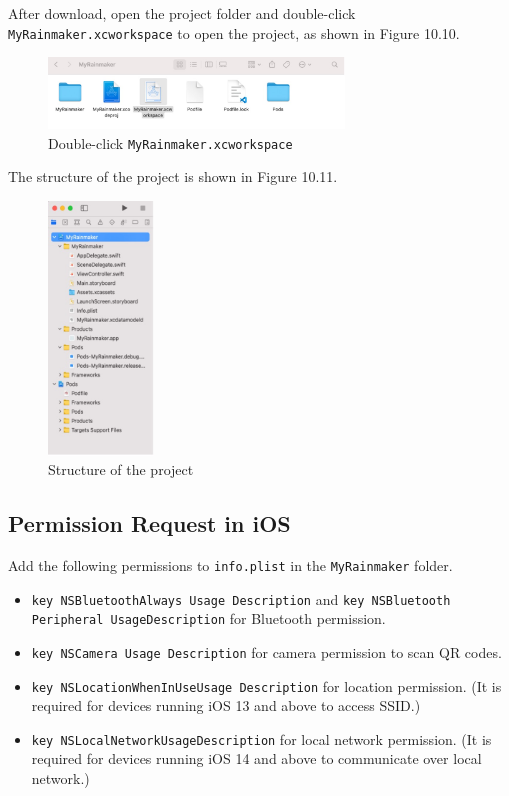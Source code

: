 \documentclass[a4paper,12pt,openany]{book}
\begin{document}
After download, open the project folder and double-click \verb|MyRainmaker.xcworkspace| to open the project, as shown in Figure 10.10.

\begin{figure}[ht]
    \centering
    \includegraphics[width=0.7\textwidth,frame]{D10Z/10-10}
    \caption{Double-click \texttt{MyRainmaker.xcworkspace}}
\end{figure}

The structure of the project is shown in Figure 10.11.

\begin{figure}[h!]
    \centering
    \includegraphics[width=0.25\textwidth]{D10Z/10-11}
    \caption{Structure of the project}
\end{figure}

\subsection{Permission Request in iOS}
Add the following permissions to \verb|info.plist| in the \verb|MyRainmaker| folder.

\begin{itemize}
    \item \verb|key NSBluetoothAlways Usage Description| and \verb|key NSBluetooth|\\
    \verb|Peripheral UsageDescription| for Bluetooth permission.
    \item \verb|key NSCamera Usage Description| for camera permission to scan QR codes.
    \item \verb|key NSLocationWhenInUseUsage Description| for location permission. (It is required for devices running iOS 13 and above to access SSID.)
    \item \verb|key NSLocalNetworkUsageDescription| for local network permission. (It is required for devices running iOS 14 and above to communicate over local network.)
\end{itemize}
\end{document}
